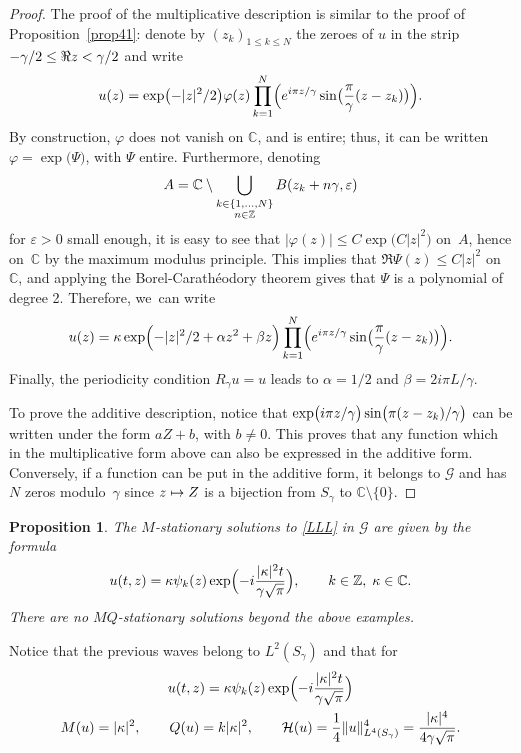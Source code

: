\documentclass[10pt]{amsart}
\newcommand\mto{\mathchoice{\longmapsto}{\mapsto}{\mapsto}{\mapsto}}
\newtheorem{prop}[theorem]{Proposition}
\theoremstyle{definition}
\let\eps\varepsilon
\let\EE\exp
\let\dis\relax
\newcommand\C{\mathbb C}
\newcommand\Z{\mathbb Z}
\begin{document}
\begin{proof}
The proof of the multiplicative description is similar to the proof of Proposition~\ref{prop41}: denote by $(z_k)_{1\leq k\leq N}$ the zeroes of $u$ in the strip $\dis -\gamma/2\leq \Re z< \gamma/2$ and write\vspace*{-3pt}
\[
\dis u(z) = \EE\bigl(-|z|^2/2\bigr) \varphi(z) \prod_{k=1}^N\Bigl(e^{{i\pi z }/{\gamma}}\sin\bigl(\frac{\pi}{\gamma}(z-z_k)\bigr)\Bigr).
\]
By construction, $\varphi$ does not vanish on $\mathbb{C}$, and is entire; thus, it can be written $\varphi = \EE\bigl(\Psi\bigr)$, with $\Psi$ entire. Furthermore, denoting
\[
\dis A = \mathbb{C} \setminus \bigcup_{\substack{k \in\{1,\dots,N\} \\ n \in \mathbb{Z}}} B(z_k+n\gamma,\eps)
\]
for $\eps>0$ small enough, it is easy to see that $|\varphi(z)| \leq C \EE\bigl(C|z|^2\bigr)$ on~$A$, hence on~$\mathbb{C}$ by the maximum modulus principle. This implies that $\Re \Psi (z) \leq C |z|^2$ on $\mathbb{C}$, and applying the Borel-Carathéodory theorem gives that $\Psi$ is a polynomial of degree 2. Therefore, we~can write\vspace*{-3pt}
\[
u(z) = \kappa \EE\Bigl({-|z|^2/2 + \alpha z^2 + \beta z}\Bigr) \prod_{k=1}^N\Bigl(e^{{i\pi z}/ {\gamma} }\sin\bigl(\frac{\pi}{\gamma}(z-z_k)\bigr)\Bigr).
\]
Finally, the periodicity condition $R_\gamma u = u$ leads to $\alpha = {1}/2$ and $\beta = {2i\pi L}/{\gamma}$.

To prove the additive description, notice that $\dis \EE\bigl({{i\pi z}/{\gamma} }\bigr)\sin\bigl({\pi}(z-z_k)/\gamma\bigr)$ can be written under the form $aZ+b$, with $b \neq 0$. This proves that any function which in the multiplicative form above can also be expressed in the additive form. Conversely, if a function can be put in the additive form, it belongs to $\mathcal{G}$ and has $N$ zeros modulo~$\gamma$ since $z \mto Z$ is a bijection from $S_\gamma$ to $\mathbb{C} \setminus\{ 0 \}$.
\end{proof}

\begin{prop}
The $M$-stationary solutions to \eqref{LLL} in $\mathcal{G}$ are given by the formula\vspace*{-3pt}
\[
u(t,z)=\kappa \psi_k(z) \EE\Bigl(-i \frac{|\kappa|^2 t }{\gamma\sqrt{\pi}}\Bigr), \quad\quad k \in \Z, \; \kappa \in \C.
\]
There are no $MQ$-stationary solutions beyond the above examples.
\end{prop}

Notice that the previous waves belong to $L^2(S_{\gamma})$ and that for
\begin{gather*}
u(t,z)=\kappa \psi_k(z) \EE\Bigl(-i \frac{|\kappa|^2 t }{\gamma\sqrt{\pi}}\Bigr)
\\
M(u)=|\kappa|^2, \qquad Q(u)=k|\kappa|^2, \qquad \mathcal{H}(u)=\frac14 \|u\|^4_{L^4(S_{\gamma})}=\frac{|\kappa|^4}{4\gamma\sqrt{\pi}}.
\end{gather*}
\end{document}
